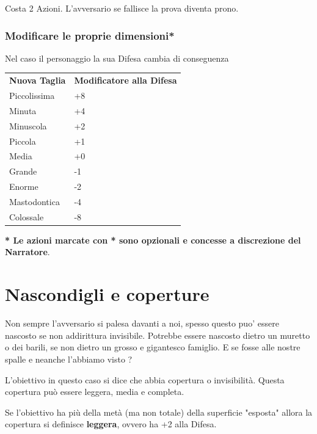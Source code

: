 \documentclass[a4paper,11pt,twoside,openany]{book}
\begin{document}
Costa 2 Azioni. L'avversario se fallisce la prova diventa prono.

\subsubsection{Modificare le proprie dimensioni*}

Nel caso il personaggio  la sua Difesa cambia di conseguenza

\bigskip

\begin{tabular}{ll}
	\toprule
	\textbf{Nuova Taglia} & \textbf{Modificatore alla Difesa}\\
	Piccolissima          & +8\\
	Minuta                & +4\\
	Minuscola             & +2\\
	Piccola               & +1\\
	Media                 & +0\\
	Grande                & -1\\
	Enorme                & -2\\
	Mastodontica          & -4\\
	Colossale             & -8\\
\end{tabular}

\bigskip

\textbf{{*} Le azioni marcate con {*} sono opzionali e concesse a
	discrezione del Narratore}.

\pagebreak

\section{Nascondigli e coperture}

\label{nascondigli-e-coperture}
Non sempre l'avversario si palesa davanti a noi, spesso questo puo' essere nascosto se non addirittura invisibile.
Potrebbe essere nascosto dietro un muretto o dei barili, se non dietro un grosso e gigantesco famiglio.
E se fosse alle nostre spalle e neanche l'abbiamo visto ?

L'obiettivo in questo caso si dice che abbia copertura o invisibilità. Questa copertura può essere leggera, media e completa.

Se l'obiettivo ha più della metà (ma non totale) della superficie "esposta" allora la copertura si definisce \textbf{leggera}, ovvero ha +2 alla Difesa.
\end{document}
